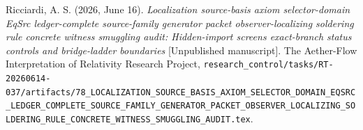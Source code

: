 \documentclass[11pt]{article}
\begin{document}
Ricciardi, A. S. (2026, June 16). \emph{Localization source-basis
axiom selector-domain EqSrc ledger-complete source-family generator
packet observer-localizing soldering rule concrete witness smuggling
audit: Hidden-import screens exact-branch status controls and
bridge-ladder boundaries} [Unpublished manuscript]. The Aether-Flow
Interpretation of Relativity Research Project,
\texttt{research\_control/tasks/RT-20260614-037/artifacts/78\_LOCALIZATION\_SOURCE\_BASIS\_AXIOM\_SELECTOR\_DOMAIN\_EQSRC\_LEDGER\_COMPLETE\_SOURCE\_FAMILY\_GENERATOR\_PACKET\_OBSERVER\_LOCALIZING\_SOLDERING\_RULE\_CONCRETE\_WITNESS\_SMUGGLING\_AUDIT.tex}.
\end{document}

